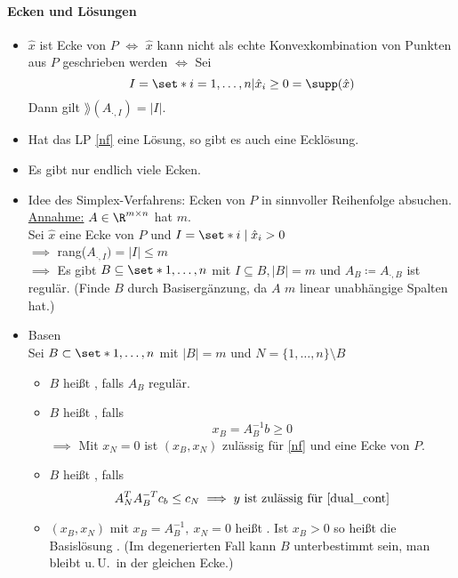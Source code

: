 \paragraph{Ecken und Lösungen}
\begin{itemize}
  \item $\hat{x}$ ist Ecke von $P$ $\iff$ $ \hat{x}$ kann nicht als echte Konvexkombination von Punkten aus $P$ geschrieben werden
		$\iff$ Sei
		\begin{equation*}
			I = \set*{i = 1 ,\dots, n | \hat{x}_{i} \geq 0 } = \supp(\hat{x})
		\end{equation*}
		Dann gilt $\rang(A_{\cdot,I})=|I|$.
	\item Hat das LP \eqref{nf} eine Lösung, so gibt es auch eine Ecklösung.
	\item Es gibt nur endlich viele Ecken.
	\item Idee des Simplex-Verfahrens: Ecken von $P$ in sinnvoller Reihenfolge absuchen.\\
		\underline{Annahme:} $A \in \R^{m \times n }$ hat  $m$. \\
		Sei $\hat{x}$ eine Ecke von $P$ und $I = \set*{i \mid \hat{x}_{i}>0}$ \\
		$\implies$ rang($A_{\cdot,I}   )= |I| \leq m$ \\
    $\implies$ Es gibt $B \subseteq \set*{1,\dots,n}$ mit $I \subseteq B, |B| = m $ und $A_{B}\coloneqq A_{\cdot,B}$ ist regulär. (Finde $B$ durch Basisergänzung, da $A$ $m$ linear unabhängige Spalten hat.)
	\item Basen\\
		Sei $B \subset \set*{1,\dots,n}$ mit $|B|=m$ und $N = \{1,\dots,n\}\setminus B$
    \begin{itemize}[label=$\to$] %
      \item $B$ heißt , falls $A_{B}$ regulär.
      \item $B$ heißt , falls
        \begin{equation*}
          x_{B}=A_{B}^{-1}b \geq 0
        \end{equation*} $\implies$ Mit $x_{N} = 0$ ist $(x_{B},x_{N})$ zulässig für \eqref{nf} und eine Ecke von $P$.
      \item $B$ heißt , falls
        \begin{equation*}
          A_{N}^TA_{B}^{-T}c_{b} \leq c_{N} \implies y \text{ ist zulässig für \eqref{dual_cont}}
        \end{equation*}
      \item $\left(x_{B},x_{N} \right)$ mit $x_{B} = A^{-1}_{B},\ x_{N}= 0$ heißt . Ist $x_{B} > 0 $ so heißt die Basislösung .
        (Im degenerierten Fall kann $B$ unterbestimmt sein, man bleibt u.\,U.\ in der gleichen Ecke.)
    \end{itemize}
\end{itemize}
%
